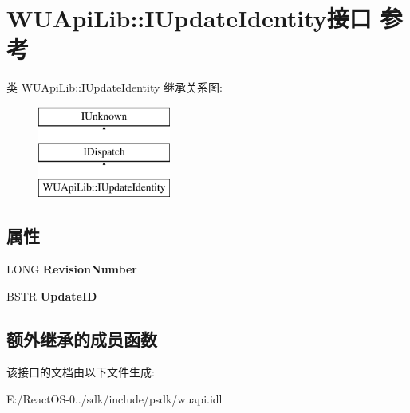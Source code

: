 \hypertarget{interface_w_u_api_lib_1_1_i_update_identity}{}\section{W\+U\+Api\+Lib\+:\+:I\+Update\+Identity接口 参考}
\label{interface_w_u_api_lib_1_1_i_update_identity}
类 W\+U\+Api\+Lib\+:\+:I\+Update\+Identity 继承关系图\+:\begin{figure}[H]
\begin{center}
\leavevmode
\includegraphics[height=3.000000cm]{interface_w_u_api_lib_1_1_i_update_identity}
\end{center}
\end{figure}
\subsection*{属性}
\begin{DoxyCompactItemize}
\item 
\mbox{\label{interface_w_u_api_lib_1_1_i_update_identity_a4da6f3560298142d72fec8950fd2574f}} 
L\+O\+NG {\bfseries Revision\+Number}
\item 
\mbox{\label{interface_w_u_api_lib_1_1_i_update_identity_aa0b0cf84fb5229b5bc6ddc06a688e4a2}} 
B\+S\+TR {\bfseries Update\+ID}
\end{DoxyCompactItemize}
\subsection*{额外继承的成员函数}


该接口的文档由以下文件生成\+:\begin{DoxyCompactItemize}
\item 
E\+:/\+React\+O\+S-\/0../sdk/include/psdk/wuapi.\+idl\end{DoxyCompactItemize}
